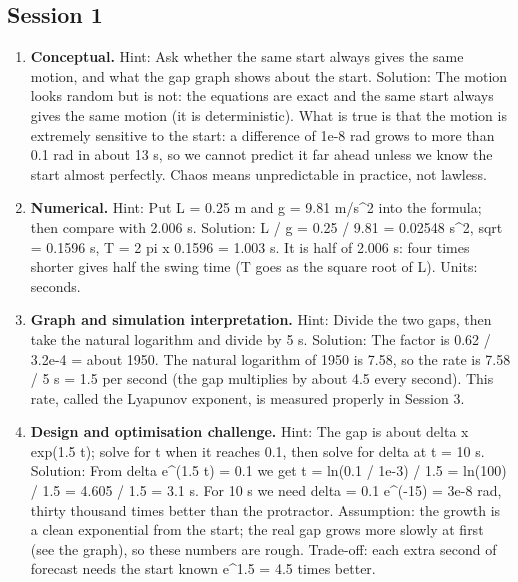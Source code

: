 \documentclass[11pt,a4paper]{article}
\begin{document}
\subsection*{Session 1}
\begin{enumerate}[nosep]
\item \textbf{Conceptual.} Hint: Ask whether the same start always gives the same motion, and what the gap graph shows about the start. Solution: The motion looks random but is not: the equations are exact and the same start always gives the same motion (it is deterministic). What is true is that the motion is extremely sensitive to the start: a difference of 1e-8 rad grows to more than 0.1 rad in about 13 s, so we cannot predict it far ahead unless we know the start almost perfectly. Chaos means unpredictable in practice, not lawless.
\item \textbf{Numerical.} Hint: Put L = 0.25 m and g = 9.81 m/s\textasciicircum{}2 into the formula; then compare with 2.006 s. Solution: L / g = 0.25 / 9.81 = 0.02548 s\textasciicircum{}2, sqrt = 0.1596 s, T = 2 pi x 0.1596 = 1.003 s. It is half of 2.006 s: four times shorter gives half the swing time (T goes as the square root of L). Units: seconds.
\item \textbf{Graph and simulation interpretation.} Hint: Divide the two gaps, then take the natural logarithm and divide by 5 s. Solution: The factor is 0.62 / 3.2e-4 = about 1950. The natural logarithm of 1950 is 7.58, so the rate is 7.58 / 5 s = 1.5 per second (the gap multiplies by about 4.5 every second). This rate, called the Lyapunov exponent, is measured properly in Session 3.
\item \textbf{Design and optimisation challenge.} Hint: The gap is about delta x exp(1.5 t); solve for t when it reaches 0.1, then solve for delta at t = 10 s. Solution: From delta e\textasciicircum{}(1.5 t) = 0.1 we get t = ln(0.1 / 1e-3) / 1.5 = ln(100) / 1.5 = 4.605 / 1.5 = 3.1 s. For 10 s we need delta = 0.1 e\textasciicircum{}(-15) = 3e-8 rad, thirty thousand times better than the protractor. Assumption: the growth is a clean exponential from the start; the real gap grows more slowly at first (see the graph), so these numbers are rough. Trade-off: each extra second of forecast needs the start known e\textasciicircum{}1.5 = 4.5 times better.
\end{enumerate}
\end{document}
